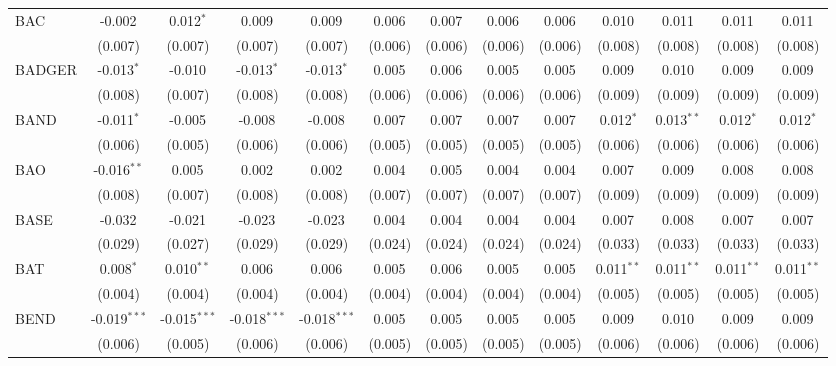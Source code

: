 \begin{table}[!htbp]
\begin{tabular}{@{\extracolsep{5pt}}lcccccccccccc}
 BAC & -0.002$^{}$ & 0.012$^{*}$ & 0.009$^{}$ & 0.009$^{}$ & 0.006$^{}$ & 0.007$^{}$ & 0.006$^{}$ & 0.006$^{}$ & 0.010$^{}$ & 0.011$^{}$ & 0.011$^{}$ & 0.011$^{}$ \\
  & (0.007) & (0.007) & (0.007) & (0.007) & (0.006) & (0.006) & (0.006) & (0.006) & (0.008) & (0.008) & (0.008) & (0.008) \\
 BADGER & -0.013$^{*}$ & -0.010$^{}$ & -0.013$^{*}$ & -0.013$^{*}$ & 0.005$^{}$ & 0.006$^{}$ & 0.005$^{}$ & 0.005$^{}$ & 0.009$^{}$ & 0.010$^{}$ & 0.009$^{}$ & 0.009$^{}$ \\
  & (0.008) & (0.007) & (0.008) & (0.008) & (0.006) & (0.006) & (0.006) & (0.006) & (0.009) & (0.009) & (0.009) & (0.009) \\
 BAND & -0.011$^{*}$ & -0.005$^{}$ & -0.008$^{}$ & -0.008$^{}$ & 0.007$^{}$ & 0.007$^{}$ & 0.007$^{}$ & 0.007$^{}$ & 0.012$^{*}$ & 0.013$^{**}$ & 0.012$^{*}$ & 0.012$^{*}$ \\
  & (0.006) & (0.005) & (0.006) & (0.006) & (0.005) & (0.005) & (0.005) & (0.005) & (0.006) & (0.006) & (0.006) & (0.006) \\
 BAO & -0.016$^{**}$ & 0.005$^{}$ & 0.002$^{}$ & 0.002$^{}$ & 0.004$^{}$ & 0.005$^{}$ & 0.004$^{}$ & 0.004$^{}$ & 0.007$^{}$ & 0.009$^{}$ & 0.008$^{}$ & 0.008$^{}$ \\
  & (0.008) & (0.007) & (0.008) & (0.008) & (0.007) & (0.007) & (0.007) & (0.007) & (0.009) & (0.009) & (0.009) & (0.009) \\
 BASE & -0.032$^{}$ & -0.021$^{}$ & -0.023$^{}$ & -0.023$^{}$ & 0.004$^{}$ & 0.004$^{}$ & 0.004$^{}$ & 0.004$^{}$ & 0.007$^{}$ & 0.008$^{}$ & 0.007$^{}$ & 0.007$^{}$ \\
  & (0.029) & (0.027) & (0.029) & (0.029) & (0.024) & (0.024) & (0.024) & (0.024) & (0.033) & (0.033) & (0.033) & (0.033) \\
 BAT & 0.008$^{*}$ & 0.010$^{**}$ & 0.006$^{}$ & 0.006$^{}$ & 0.005$^{}$ & 0.006$^{}$ & 0.005$^{}$ & 0.005$^{}$ & 0.011$^{**}$ & 0.011$^{**}$ & 0.011$^{**}$ & 0.011$^{**}$ \\
  & (0.004) & (0.004) & (0.004) & (0.004) & (0.004) & (0.004) & (0.004) & (0.004) & (0.005) & (0.005) & (0.005) & (0.005) \\
 BEND & -0.019$^{***}$ & -0.015$^{***}$ & -0.018$^{***}$ & -0.018$^{***}$ & 0.005$^{}$ & 0.005$^{}$ & 0.005$^{}$ & 0.005$^{}$ & 0.009$^{}$ & 0.010$^{}$ & 0.009$^{}$ & 0.009$^{}$ \\
  & (0.006) & (0.005) & (0.006) & (0.006) & (0.005) & (0.005) & (0.005) & (0.005) & (0.006) & (0.006) & (0.006) & (0.006) \\

\end{tabular}
\end{table}
